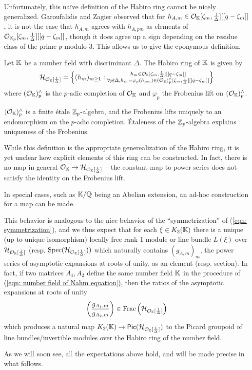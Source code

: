 Unfortunately, this na\"{i}ve definition of the Habiro ring cannot be nicely generalized. Garoufalidis and Zagier observed that for $h_{A,m}\in\mathcal{O}_{\mathbb{K}}[\zeta_{m},\frac{1}{\Delta}][[q-\zeta_{m}]]$, it is not the case that $h_{A,m}$ agrees with $h_{A,pm}$ as elements of $\mathcal{O}_{\mathbb{K}_{p}}[\zeta_{m},\frac{1}{\Delta}][[q-\zeta_{m}]]$, though it does agree up a sign depending on the residue class of the prime $p$ modulo 3. This allows us to give the eponymous definition. 
\begin{definition}\label{def: Habiro ring of a number field}
    Let $\mathbb{K}$ be a number field with discriminant $\Delta$. The Habiro ring of $\mathbb{K}$ is given by 
    $$\mathcal{H}_{\mathcal{O}_{\mathbb{K}}[\frac{1}{\Delta}]}=\left\{(h_{m})_{m\geq1}:\substack{h_{m}\in\mathcal{O}_{\mathbb{K}}[\zeta_{m},\frac{1}{\Delta}][[q-\zeta_{m}]] \\
    \forall p\nmid\Delta, h_{m}=\varphi_{p}(h_{pm})\in(\mathcal{O}_{\mathbb{K}})_{p}^{\wedge}[\zeta_{m},\frac{1}{\Delta}][[q-\zeta_{m}]]}\right\}$$
    where $(\mathcal{O}_{\mathbb{K}})_{p}^{\wedge}$ is the $p$-adic completion of $\mathcal{O}_{\mathbb{K}}$ and $\varphi_{p}$ the Frobenius lift on $(\mathcal{O}_{\mathbb{K}})_{p}^{\wedge}$. 
\end{definition}
\begin{remark}
    $(\mathcal{O}_{\mathbb{K}})_{p}^{\wedge}$ is a finite \'{e}tale $\mathbb{Z}_{p}$-algebra, and the Frobenius lifts uniquely to an endomorphism on the $p$-adic completion. \'{E}taleness of the $\mathbb{Z}_{p}$-algebra explains uniqueness of the Frobenius.  
\end{remark}
While this definition is the appropriate generealization of the Habiro ring, it is yet unclear how explicit elements of this ring can be constructed. In fact, there is no map in general $\mathcal{O}_{\mathbb{K}}\to\mathcal{H}_{\mathcal{O}_{\mathbb{K}}[\frac{1}{\Delta}]}$ -- the constant map to power series does not satisfy the identity on the Frobenius lift. 
\begin{remark}
    In special cases, such as $\mathbb{K}/\mathbb{Q}$ being an Abelian extension, an ad-hoc construction for a map can be made. 
\end{remark}
This behavior is analogous to the nice behavior of the ``symmetrization'' of (\ref{eqn: symmetrization}), and we thus expect that for each $\xi\in K_{3}(\mathbb{K})$ there is a unique (up to unique isomorphism) locally free rank 1 module or line bundle $L(\xi)$ over $\mathcal{H}_{\mathcal{O}_{\mathbb{K}}[\frac{1}{\Delta}]}$ (resp. $\operatorname{Spec}(\mathcal{H}_{\mathcal{O}_{\mathbb{K}}[\frac{1}{\Delta}]}))$ which naturally contains $(g_{A,m})_{m}$, the power series of asymptotic expansions at roots of unity, as an element (resp. section). In fact, if two matrices $A_{1},A_{2}$ define the same number field $\mathbb{K}$ in the procedure of (\ref{eqn: number field of Nahm equation}), then the ratios of the asymptotic expansions at roots of unity
$$\left(\frac{g_{A_{1},m}}{g_{A_{2},m}}\right)\in\mathrm{Frac}\left(\mathcal{H}_{\mathcal{O}_{\mathbb{K}}[\frac{1}{\Delta}]}\right)$$
which produces a natural map $K_{3}(\mathbb{K})\to\mathsf{Pic}(\mathcal{H}_{\mathcal{O}_{\mathbb{K}}[\frac{1}{\Delta}]})$ to the Picard groupoid of line bundles/invertible modules over the Habiro ring of the number field. 

As we will soon see, all the expectations above hold, and will be made precise in what follows. 